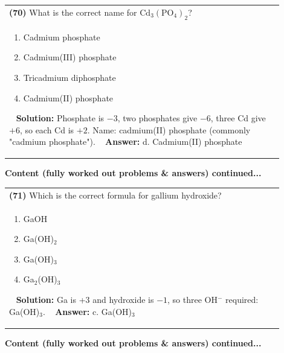 \documentclass{article}
\begin{document}
\begin{tabular}{|p{0.9\linewidth}|}
\hline
\vspace{0.2cm}
\textbf{(70)} What is the correct name for $\text{Cd}_3(\text{PO}_4)_2$? \\
\begin{minipage}[t]{0.85\linewidth}
\begin{enumerate}[label=\alph*.]
\item Cadmium phosphate \
\item Cadmium(III) phosphate \
\item Tricadmium diphosphate \
\item Cadmium(II) phosphate
\end{enumerate}
\end{minipage}\
\hline
\vspace{0.2cm}
\textbf{Solution:} Phosphate is $-3$, two phosphates give $-6$, three Cd give $+6$, so each Cd is $+2$. Name: cadmium(II) phosphate (commonly "cadmium phosphate"). \
\hline
\vspace{0.2cm}
\textbf{Answer:} d. Cadmium(II) phosphate \
\hline
\end{tabular}
\newpage
\noindent
{\large\textbf{Content (fully worked out problems & answers) continued...}}\\[0.2em]
\begin{tabular}{|p{0.9\linewidth}|}
\hline
\vspace{0.2cm}
\textbf{(71)} Which is the correct formula for gallium hydroxide? \\
\begin{minipage}[t]{0.85\linewidth}
\begin{enumerate}[label=\alph*.]
\item GaOH \
\item Ga(OH)$_2$ \
\item Ga(OH)$_3$ \
\item Ga$_2$(OH)$_3$
\end{enumerate}
\end{minipage}\
\hline
\vspace{0.2cm}
\textbf{Solution:} Ga is +3 and hydroxide is $-1$, so three OH$^-$ required: Ga(OH)$_3$. \
\hline
\vspace{0.2cm}
\textbf{Answer:} c. Ga(OH)$_3$ \
\hline
\end{tabular}
\newpage
\noindent
{\large\textbf{Content (fully worked out problems & answers) continued...}}\\[0.2em]
\end{document}
